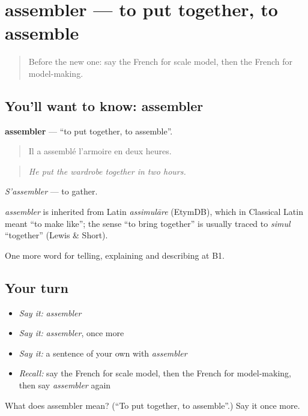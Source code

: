 \section[assembler]{assembler — to put together, to assemble}

\label{lesson:FR-C501-assembler}



\begin{quote}
Before the new one: say the French for scale model, then the French for model-making.
\end{quote}

\subsection*{You'll want to know: assembler}
\textbf{assembler} — \textquotedblleft{}to put together, to assemble\textquotedblright{}.

\begin{quote}
Il a assemblé l'armoire en deux heures.
\end{quote}

\begin{quote}
\emph{He put the wardrobe together in two hours.}
\end{quote}

\emph{S'assembler} — to gather.

\begin{cousinweb}
\emph{assembler} is inherited from Latin \emph{assimulāre} (EtymDB), which in Classical Latin meant \textquotedblleft{}to make like\textquotedblright{}; the sense \textquotedblleft{}to bring together\textquotedblright{} is usually traced to \emph{simul} \textquotedblleft{}together\textquotedblright{} (Lewis \& Short).
\end{cousinweb}

\begin{grammarlens}[title={What you've built}]
One more word for telling, explaining and describing at B1.
\end{grammarlens}

\subsection*{Your turn}
\begin{itemize}
\raggedright
  \item \emph{Say it:} \emph{assembler}
  \item \emph{Say it:} \emph{assembler}, once more
  \item \emph{Say it:} a sentence of your own with \emph{assembler}
  \item \emph{Recall:} say the French for scale model, then the French for model-making, then say \emph{assembler} again
\end{itemize}

\begin{tcolorbox}[breakable,colback=teal!4,colframe=teal!35!black,title={Before you move on}]
What does assembler mean? (\textquotedblleft{}To put together, to assemble\textquotedblright{}.) Say it once more.
\end{tcolorbox}
